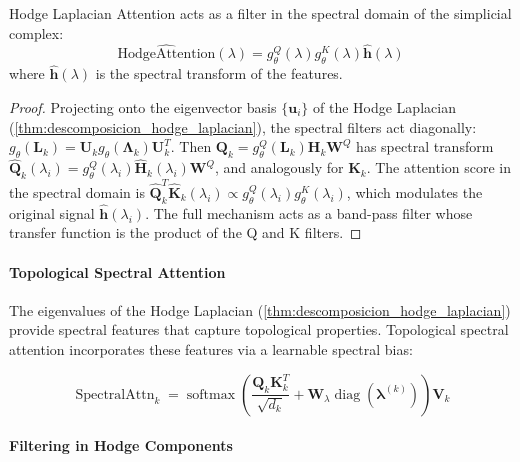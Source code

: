 \begin{theorem}\label{thm:interpretacion_frecuencial_hodge}
Hodge Laplacian Attention acts as a filter in the spectral domain of the simplicial complex:
\begin{equation}
    \widehat{\text{HodgeAttention}}(\lambda) = g_{\theta}^Q(\lambda) g_{\theta}^K(\lambda) \hat{\mathbf{h}}(\lambda)
\end{equation}
where $\hat{\mathbf{h}}(\lambda)$ is the spectral transform of the features.
\end{theorem}

\begin{proof}
Projecting onto the eigenvector basis $\{\mathbf{u}_i\}$ of the Hodge Laplacian (\autoref{thm:descomposicion_hodge_laplacian}), the spectral filters act diagonally: $g_\theta(\mathbf{L}_k) = \mathbf{U}_k g_\theta(\boldsymbol{\Lambda}_k) \mathbf{U}_k^T$. Then $\mathbf{Q}_k = g_\theta^Q(\mathbf{L}_k) \mathbf{H}_k \mathbf{W}^Q$ has spectral transform $\hat{\mathbf{Q}}_k(\lambda_i) = g_\theta^Q(\lambda_i) \hat{\mathbf{H}}_k(\lambda_i) \mathbf{W}^Q$, and analogously for $\mathbf{K}_k$. The attention score in the spectral domain is $\hat{\mathbf{Q}}_k^T \hat{\mathbf{K}}_k(\lambda_i) \propto g_\theta^Q(\lambda_i) g_\theta^K(\lambda_i)$, which modulates the original signal $\hat{\mathbf{h}}(\lambda_i)$. The full mechanism acts as a band-pass filter whose transfer function is the product of the Q and K filters.
\end{proof}

\paragraph{Topological Spectral Attention}

The eigenvalues of the Hodge Laplacian (\autoref{thm:descomposicion_hodge_laplacian}) provide spectral features that capture topological properties. Topological spectral attention incorporates these features via a learnable spectral bias:

\begin{equation}
\operatorname{SpectralAttn}_k = \operatorname{softmax}\left(\frac{\mathbf{Q}_k \mathbf{K}_k^T}{\sqrt{d_k}} + \mathbf{W}_{\lambda} \operatorname{diag}(\boldsymbol{\lambda}^{(k)})\right) \mathbf{V}_k
\label{eq:spectral_topological_attention}
\end{equation}

\paragraph{Filtering in Hodge Components}


